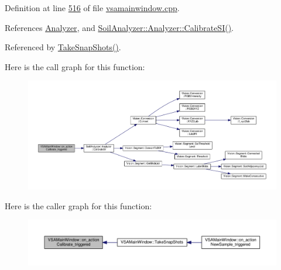 Definition at line \hyperlink{vsamainwindow_8cpp_source_l00516}{516} of file \hyperlink{vsamainwindow_8cpp_source}{vsamainwindow.\+cpp}.



References \hyperlink{vsamainwindow_8h_source_l00083}{Analyzer}, and \hyperlink{analyzer_8cpp_source_l00388}{Soil\+Analyzer\+::\+Analyzer\+::\+Calibrate\+S\+I()}.



Referenced by \hyperlink{vsamainwindow_8cpp_source_l00391}{Take\+Snap\+Shots()}.



Here is the call graph for this function\+:
\nopagebreak
\begin{figure}[H]
\begin{center}
\leavevmode
\includegraphics[width=350pt]{class_v_s_a_main_window_a0051e5a6f9f17e898e962da6debb8d8b_cgraph}
\end{center}
\end{figure}




Here is the caller graph for this function\+:
\nopagebreak
\begin{figure}[H]
\begin{center}
\leavevmode
\includegraphics[width=350pt]{class_v_s_a_main_window_a0051e5a6f9f17e898e962da6debb8d8b_icgraph}
\end{center}
\end{figure}


\hypertarget{class_v_s_a_main_window_a09c50b7552a1636c01c4f2f2817a223c}{}
